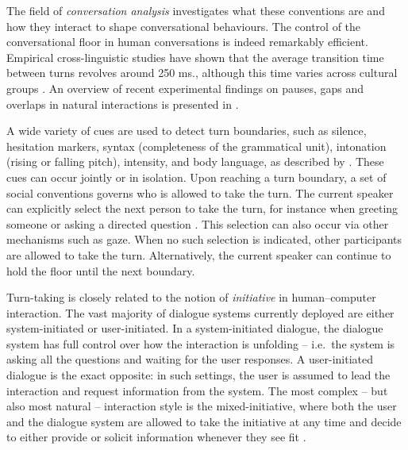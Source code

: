 The field of  \textit{conversation analysis} investigates what these conventions are and how they interact to shape conversational behaviours. The control of the conversational floor in human conversations is indeed remarkably efficient.  Empirical cross-linguistic studies have shown that the average transition time between turns revolves around 250 ms., although this time varies across cultural groups \citep{Stivers30062009}. An overview of recent experimental findings on pauses, gaps and overlaps in natural interactions is presented in \cite{Heldner2010555}.


A wide variety of cues are used to detect turn boundaries, such as silence, hesitation markers, syntax (completeness of the grammatical unit), intonation (rising or falling pitch), intensity, and body language, as described by \cite{Duncan1972}.   These cues can occur jointly or in isolation. Upon reaching a turn boundary, a set of social conventions governs who is allowed to take the turn.  The current speaker can explicitly select the next person to take the turn, for instance when greeting someone or asking a directed question \citep{sacks1974}.   This selection can also occur via other mechanisms such as gaze.  When no such selection is indicated, other participants are allowed to take the turn.  Alternatively, the current speaker can continue to hold the floor until the next boundary. 

Turn-taking is closely related to the notion of \textit{initiative} in human--computer interaction. The vast majority of dialogue systems currently deployed are either system-initiated or user-initiated.  In a system-initiated dialogue, the dialogue system has full control over how the interaction is unfolding -- i.e.\ the system is asking all the questions and waiting for the user responses.  A user-initiated dialogue is the exact opposite: in such settings, the user is assumed to lead the interaction and request information from the system.  The most complex -- but also most natural -- interaction style is the mixed-initiative, where both the user and the dialogue system are allowed to take the initiative at any time and decide to either provide or solicit information whenever they see fit \citep{Horvitz:1999}. 

